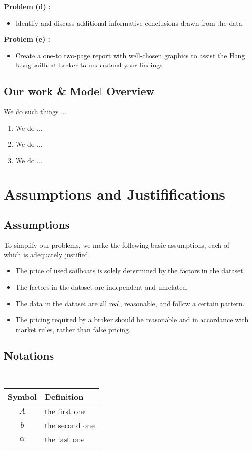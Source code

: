 \documentclass[12pt]{article}  %
\begin{document}
\textbf{Problem (d) :}
\begin{itemize}
    \item Identify and discuss additional informative conclusions drawn from the data.
\end{itemize}

\textbf{Problem (e) :}
\begin{itemize}
    \item Create a one-to two-page report with well-chosen graphics to assist the Hong Kong sailboat broker to understand your findings.
\end{itemize}
\subsection{Our work \& Model Overview}
We do such things ...



\begin{enumerate}[\bfseries 1.]
    \item We do ...
    \item We do ...
    \item We do ...
\end{enumerate}
\section{Assumptions and Justififications}
\subsection{Assumptions}
To simplify our problems, we make the following basic assumptions, each of which is
adequately justified.
\begin{itemize}
    \item The price of used sailboats is solely determined by the factors in the dataset.
    \item The factors in the dataset are independent and unrelated.
    \item The data in the dataset are all real, reasonable, and follow a certain pattern.
    \item The pricing required by a broker should be reasonable and in accordance with market rules, rather than false pricing.
\end{itemize}
\subsection{Notations}
\ 
\begin{table}[!htbp]
\begin{center}
\begin{tabular}{cl}
	\toprule
	\multicolumn{1}{m{3cm}}{\centering Symbol}
	&\multicolumn{1}{m{8cm}}{\centering Definition}\\
	\midrule
	$A$&the first one\\
	$b$&the second one\\
	$\alpha$ &the last one\\
	\bottomrule
\end{tabular}
\end{center}
\end{table}
\end{document}
